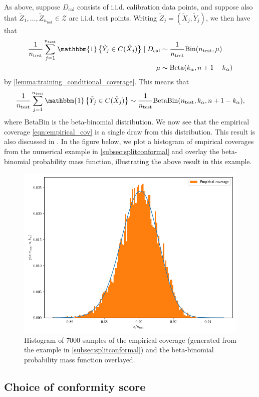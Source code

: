 \documentclass[11pt, titlepage]{article} %
\newcommand{\R}{\mathrm}
\newcommand{\Ind}[1]{\mathbbm{1}\left\{ #1 \right\}}
\numberwithin{equation}{section}
\theoremstyle{definition}
\numberwithin{theorem}{section}
\numberwithin{lemma}{section}
\numberwithin{corollary}{section}
\numberwithin{proposition}{section}
\numberwithin{definition}{section}
\numberwithin{remark}{section}
\begin{document}
\noindent
As above, suppose \(D_\R{cal}\) consists of i.i.d. calibration data points, and suppose also that \(\tilde{Z}_1, \ldots, \tilde{Z}_{n_\R{test}} \in \mathcal{Z}\) are i.i.d. test points. Writing \(\tilde{Z}_j = (\tilde{X}_j, \tilde{Y}_j)\), we then have that \begin{align*}
    \frac{1}{n_\R{test}} \sum_{j=1}^{n_\R{test}} \Ind{\tilde{Y}_j \in C(\tilde{X}_j)} \mid D_\R{cal} &\sim \frac{1}{n_\R{test}} \R{Bin}(n_\R{test}, \mu) \\
    \mu &\sim \R{Beta}(k_\alpha, n + 1 - k_\alpha)
\end{align*} by \cref{lemma:training_conditional_coverage}. This means that \[\frac{1}{n_\R{test}} \sum_{j=1}^{n_\R{test}} \Ind{\tilde{Y}_j \in C(\tilde{X}_j)} \sim \frac{1}{n_\R{test}}\R{BetaBin}(n_\R{test}, k_\alpha, n+1-k_\alpha),\] where \(\R{BetaBin}\) is the beta-binomial distribution. We now see that the empirical coverage \eqref{eqn:empirical_cov} is a single draw from this distribution. This result is also discussed in \cite{angelopoulos2021gentle,tibs_advanced_topics}. In the figure below, we plot a histogram of empirical coverages from the numerical example in \cref{subsec:splitconformal} and overlay the beta-binomial probability mass function, illustrating the above result in this example.

\begin{figure}[H]
    \centering
    \includegraphics[width=0.6\linewidth]{figures/2_3_training_beta_dist.png}
    \caption{Histogram of \(7000\) samples of the empirical coverage (generated from the example in \cref{subsec:splitconformal}) and the beta-binomial probability mass function overlayed.}
\end{figure}

\subsection{Choice of conformity score}
\label{subsec:conformityscore}
\end{document}
